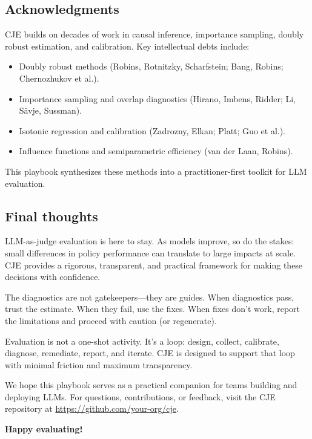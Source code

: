 \subsection{Acknowledgments}

CJE builds on decades of work in causal inference, importance sampling, doubly robust estimation, and calibration. Key intellectual debts include:
\begin{itemize}
\item Doubly robust methods (Robins, Rotnitzky, Scharfstein; Bang, Robins; Chernozhukov et al.).
\item Importance sampling and overlap diagnostics (Hirano, Imbens, Ridder; Li, Sävje, Sussman).
\item Isotonic regression and calibration (Zadrozny, Elkan; Platt; Guo et al.).
\item Influence functions and semiparametric efficiency (van der Laan, Robins).
\end{itemize}

This playbook synthesizes these methods into a practitioner-first toolkit for LLM evaluation.

\subsection{Final thoughts}

LLM-as-judge evaluation is here to stay. As models improve, so do the stakes: small differences in policy performance can translate to large impacts at scale. CJE provides a rigorous, transparent, and practical framework for making these decisions with confidence.

The diagnostics are not gatekeepers---they are guides. When diagnostics pass, trust the estimate. When they fail, use the fixes. When fixes don't work, report the limitations and proceed with caution (or regenerate).

Evaluation is not a one-shot activity. It's a loop: design, collect, calibrate, diagnose, remediate, report, and iterate. CJE is designed to support that loop with minimal friction and maximum transparency.

We hope this playbook serves as a practical companion for teams building and deploying LLMs. For questions, contributions, or feedback, visit the CJE repository at \url{https://github.com/your-org/cje}.

\vspace{1em}
\noindent\textbf{Happy evaluating!}
